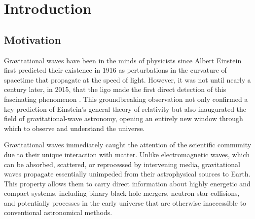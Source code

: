 
\chapter{Introduction}
\label{chapter:introduction}


\section{Motivation}
\label{section:motivation}

Gravitational waves have been in the minds of physicists since Albert Einstein first predicted their existence in 1916 as perturbations in the curvature of spacetime that propagate at the speed of light. However, it was not until nearly a century later, in 2015, that the \acrfull{ligo} made the first direct detection of this fascinating phenomenon \cite{PhysRevLett.116.061102}. This groundbreaking observation not only confirmed a key prediction of Einstein's general theory of relativity but also inaugurated the field of gravitational-wave astronomy, opening an entirely new window through which to observe and understand the universe.

Gravitational waves immediately caught the attention of the scientific community due to their unique interaction with matter. Unlike electromagnetic waves, which can be absorbed, scattered, or reprocessed by intervening media, gravitational waves propagate essentially unimpeded from their astrophysical sources to Earth. This property allows them to carry direct information about highly energetic and compact systems, including binary black hole mergers, neutron star collisions, and potentially processes in the early universe that are otherwise inaccessible to conventional astronomical methods.

